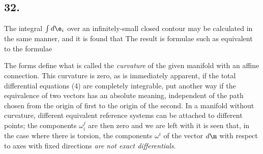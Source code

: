 \subsection*{32.}

The integral $\int d\e_i$ over an infinitely-small closed contour may be calculated in the same manner, and it is found that
The result is formulae such as
equivalent to the formulae

The forms define what is called the \textit{curvature} of the given manifold with an affine connection. This curvature is zero, as is immediately apparent, if the total differential equations (4) are completely integrable, put another way if the equivalence of two vectors has an absolute meaning, independent of the path chosen from the origin of first to the origin of the second. In a manifold without curvature, different equivalent reference systems can be attached to different points; the components $\omega_i^j$ are then zero and we are left with
it is seen that, in the case where there is torsion, the components $\omega^i$ of the vector $d\m$ with respect to axes with fixed directions \textit{are not exact differentials}.
